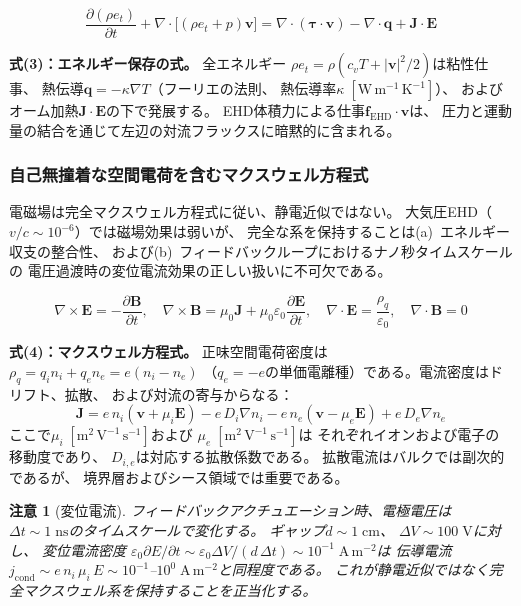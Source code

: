 \documentclass[12pt,twocolumn]{ltjsarticle}
\newtheorem{remark}{注意}
\newcommand{\ee}{\mathbf{E}}
\newcommand{\bb}{\mathbf{B}}
\newcommand{\jj}{\mathbf{J}}
\newcommand{\vv}{\mathbf{v}}
\newcommand{\ff}{\mathbf{f}}
\renewcommand{\qq}{\mathbf{q}}
\begin{document}
\begin{equation}
\boxed{
  \frac{\partial (\rho e_t)}{\partial t}
  + \nabla \cdot \bigl[(\rho e_t + p)\vv\bigr]
  = \nabla \cdot (\bm{\tau} \cdot \vv)
  - \nabla \cdot \qq + \jj \cdot \ee
}
\tag{3}
\label{eq:NS3}
\end{equation}

\noindent
\textbf{式(3)：エネルギー保存の式。} 全エネルギー
$\rho e_t = \rho(c_v T + |\vv|^2/2)$は粘性仕事、
熱伝導$\qq = -\kappa\nabla T$（フーリエの法則、
熱伝導率$\kappa\;[\mathrm{W\,m^{-1}\,K^{-1}}]$）、
およびオーム加熱$\jj \cdot \ee$の下で発展する。
EHD体積力による仕事$\ff_{\mathrm{EHD}} \cdot \vv$は、
圧力と運動量の結合を通じて左辺の対流フラックスに暗黙的に含まれる。

\subsubsection{自己無撞着な空間電荷を含むマクスウェル方程式}

電磁場は完全マクスウェル方程式に従い、静電近似ではない。
大気圧EHD（$v/c \sim 10^{-6}$）では磁場効果は弱いが、
完全な系を保持することは(a)~エネルギー収支の整合性、
および(b)~フィードバックループにおけるナノ秒タイムスケールの
電圧過渡時の変位電流効果の正しい扱いに不可欠である。

\begin{equation}
\boxed{
  \nabla \times \ee = -\frac{\partial \bb}{\partial t}, \quad
  \nabla \times \bb = \mu_0 \jj
    + \mu_0 \varepsilon_0 \frac{\partial \ee}{\partial t}, \quad
  \nabla \cdot \ee = \frac{\rho_q}{\varepsilon_0}, \quad
  \nabla \cdot \bb = 0
}
\tag{4}
\label{eq:Maxwell}
\end{equation}

\noindent
\textbf{式(4)：マクスウェル方程式。} 正味空間電荷密度は
$\rho_q = q_i n_i + q_e n_e = e(n_i - n_e)$
（$q_e = -e$の単価電離種）である。電流密度はドリフト、拡散、
および対流の寄与からなる：
\begin{equation}
  \jj = e\,n_i(\vv + \mu_i \ee) - e\,D_i\nabla n_i
      - e\,n_e(\vv - \mu_e \ee) + e\,D_e\nabla n_e
  \label{eq:current_density}
\end{equation}
ここで$\mu_i\;[\mathrm{m^2\,V^{-1}\,s^{-1}}]$および
$\mu_e\;[\mathrm{m^2\,V^{-1}\,s^{-1}}]$は
それぞれイオンおよび電子の移動度であり、
$D_{i,e}$は対応する拡散係数である。
拡散電流はバルクでは副次的であるが、
境界層およびシース領域では重要である。

\begin{remark}[変位電流]
\label{rem:displacement}
フィードバックアクチュエーション時、電極電圧は
$\Delta t \sim 1\;\mathrm{ns}$のタイムスケールで変化する。
ギャップ$d \sim 1\;\mathrm{cm}$、
$\Delta V \sim 100\;\mathrm{V}$に対し、
変位電流密度
$\varepsilon_0 \partial E/\partial t \sim \varepsilon_0 \Delta V /
(d\,\Delta t) \sim 10^{-1}\;\mathrm{A\,m^{-2}}$は
伝導電流
$j_{\mathrm{cond}} \sim e\,n_i\,\mu_i\,E \sim 10^{-1}$--$10^{0}\;
\mathrm{A\,m^{-2}}$と同程度である。
これが静電近似ではなく完全マクスウェル系を保持することを正当化する。
\end{remark}
\end{document}

